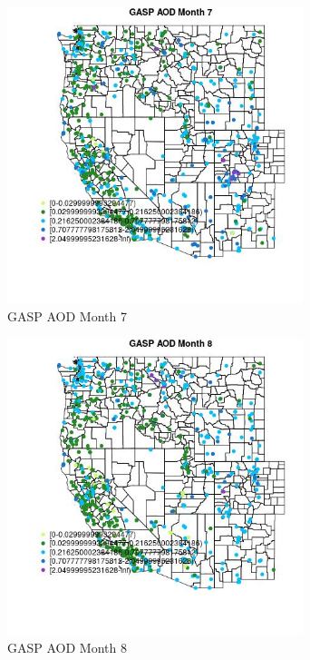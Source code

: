 \begin{figure} 
\centering  
\includegraphics[width=0.77\textwidth]{Code_Outputs/Report_ML_input_PM25_Step4_part_e_de_duplicated_aves_compiled_2019-05-21wNAs_MapObsMo7GASP_AOD.jpg} 
\caption{\label{fig:Report_ML_input_PM25_Step4_part_e_de_duplicated_aves_compiled_2019-05-21wNAsMapObsMo7GASP_AOD}GASP AOD Month 7} 
\end{figure} 
 

\begin{figure} 
\centering  
\includegraphics[width=0.77\textwidth]{Code_Outputs/Report_ML_input_PM25_Step4_part_e_de_duplicated_aves_compiled_2019-05-21wNAs_MapObsMo8GASP_AOD.jpg} 
\caption{\label{fig:Report_ML_input_PM25_Step4_part_e_de_duplicated_aves_compiled_2019-05-21wNAsMapObsMo8GASP_AOD}GASP AOD Month 8} 
\end{figure} 
 

